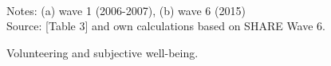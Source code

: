 \documentclass[10pt, letterpaper]{article}
\begin{document}
\begin{spacing}{1.4}
\begin{figure}[H]
\centering
\caption{Volunteering and subjective well-being.}  
\label{fig:taub}
\begin{minipage}{1\linewidth}
\quad
{}~\\
{\footnotesize Notes: (a) wave 1 (2006-2007), (b) wave 6 (2015) }~\\
{\footnotesize Source: \citet{haski09} [Table 3] and own calculations based on SHARE Wave 6.}
\end{minipage}
\end{figure} 

%



\end{spacing}
\end{document}
